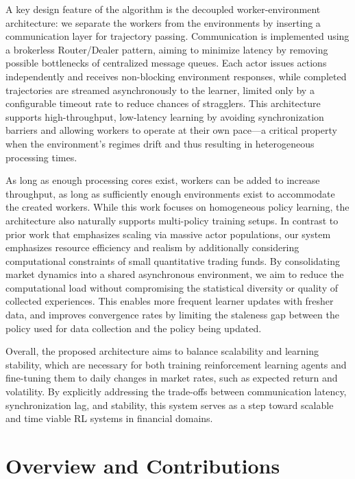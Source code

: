 A key design feature of the algorithm is the decoupled worker-environment architecture:
we separate the workers from the environments by inserting a communication layer for trajectory passing.
Communication is implemented using a brokerless Router/Dealer pattern, aiming to minimize latency by
removing possible bottlenecks of centralized message queues.
Each actor issues actions independently and receives non-blocking environment responses,
while completed trajectories are streamed asynchronously to the learner,
limited only by a configurable timeout rate to reduce chances of stragglers.
This architecture supports high-throughput, low-latency learning by avoiding synchronization barriers and
allowing workers to operate at their own pace---a critical property when the environment's regimes drift and
thus resulting in heterogeneous processing times.

As long as enough processing cores exist, workers can be added to increase throughput, as long
as sufficiently enough environments exist to accommodate the created workers.
While this work focuses on homogeneous policy learning, the architecture also naturally supports multi-policy training setups.
In contrast to prior work that emphasizes scaling via massive actor populations,
our system emphasizes resource efficiency and realism by additionally considering computational constraints of small quantitative trading funds.
By consolidating market dynamics into a shared asynchronous environment,
we aim to reduce the computational load without compromising the statistical diversity or quality of collected experiences.
This enables more frequent learner updates with fresher data, and improves convergence rates by limiting the staleness gap
between the policy used for data collection and the policy being updated.

Overall, the proposed architecture aims to balance scalability and learning stability,
which are necessary for both training reinforcement learning agents and fine-tuning them to daily changes
in market rates, such as expected return and volatility.
By explicitly addressing the trade-offs between communication latency, synchronization lag, and stability,
this system serves as a step toward scalable and time viable RL systems in financial domains.

\section{Overview and Contributions}
\label{sec:overview}

